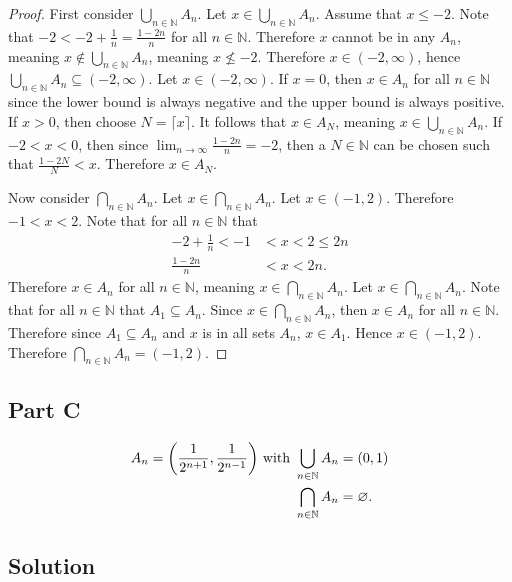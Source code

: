 \documentclass[12pt]{extarticle}
\begin{document}
\begin{proof}
	First consider $\bigcup_{n \in \mathbb{N}} A_n$. Let $x \in \bigcup_{n \in \mathbb{N}} A_n$. Assume that $x \leq -2$. Note that $-2 < -2 + \frac{1}{n} = \frac{1-2n}{n}$ for all $n \in \mathbb{N}$. Therefore $x$ cannot be in any $A_n$, meaning $x \notin \bigcup_{n \in \mathbb{N}} A_n$, meaning $x \nleq -2$. Therefore $x \in (-2, \infty)$, hence $\bigcup_{n \in \mathbb{N}} A_n \subseteq (-2, \infty)$. Let $x \in (-2, \infty)$. If $x = 0$, then $x \in A_n$ for all $n \in \mathbb{N}$ since the lower bound is always negative and the upper bound is always positive. If $x > 0$, then choose $N = \lceil x \rceil$. It follows that $x \in A_N$, meaning $x \in \bigcup_{n \in \mathbb{N}} A_n$. If $-2 < x < 0$, then since $\lim_{n \to \infty} \frac{1-2n}{n} = -2$, then a $N \in \mathbb{N}$ can be chosen such that $\frac{1-2N}{N} < x$. Therefore $x \in A_N$.

	\hfill\linebreak

	Now consider $\bigcap_{n \in \mathbb{N}} A_n$. Let $x \in \bigcap_{n \in \mathbb{N}} A_n$. Let $x \in (-1,2)$. Therefore $-1 < x < 2$. Note that for all $n \in \mathbb{N}$ that
	\begin{align*}
		-2 + \frac{1}{n} < -1 &< x < 2 \leq 2n \\
		\frac{1 - 2n}{n} &< x < 2n
	.\end{align*}
	Therefore $x \in A_n$ for all $n \in \mathbb{N}$, meaning $x \in \bigcap_{n \in \mathbb{N}} A_n$. Let $x \in \bigcap_{n \in \mathbb{N}} A_n$. Note that for all $n \in \mathbb{N}$ that $A_1 \subseteq A_n$. Since $x \in \bigcap_{n \in \mathbb{N}} A_n$, then $x \in A_n$ for all $n \in \mathbb{N}$. Therefore since $A_1 \subseteq A_n$ and $x$ is in all sets $A_n$, $x \in A_1$. Hence $x \in (-1,2)$. Therefore $\bigcap\limits_{n \in \mathbb{N}} A_n = (-1, 2)$.
\end{proof}

\subsection*{Part C}

\begin{align*}
	A_n = \qty(\frac{1}{2^{n+1}}, \frac{1}{2^{n-1}}) \text{ with } \bigcup\limits_{n \in \mathbb{N}} A_n &= (0,1) \\
	\bigcap\limits_{n \in \mathbb{N}} A_n &= \varnothing
.\end{align*}

\subsection*{Solution}
\end{document}
